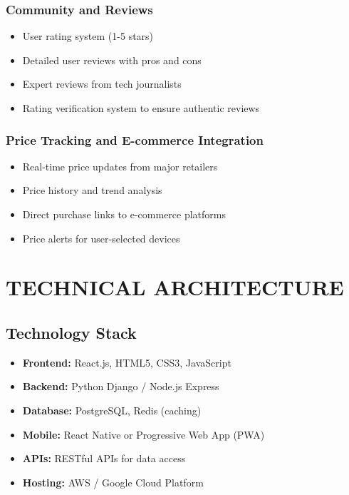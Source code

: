 \documentclass[12pt]{article}
\begin{document}
\subsubsection{Community and Reviews}
\begin{itemize}
    \item User rating system (1-5 stars)
    \item Detailed user reviews with pros and cons
    \item Expert reviews from tech journalists
    \item Rating verification system to ensure authentic reviews
\end{itemize}

\subsubsection{Price Tracking and E-commerce Integration}
\begin{itemize}
    \item Real-time price updates from major retailers
    \item Price history and trend analysis
    \item Direct purchase links to e-commerce platforms
    \item Price alerts for user-selected devices
\end{itemize}

\section{TECHNICAL ARCHITECTURE}

\subsection{Technology Stack}
\begin{itemize}
    \item \textbf{Frontend:} React.js, HTML5, CSS3, JavaScript
    \item \textbf{Backend:} Python Django / Node.js Express
    \item \textbf{Database:} PostgreSQL, Redis (caching)
    \item \textbf{Mobile:} React Native or Progressive Web App (PWA)
    \item \textbf{APIs:} RESTful APIs for data access
    \item \textbf{Hosting:} AWS / Google Cloud Platform
\end{itemize}
\end{document}
